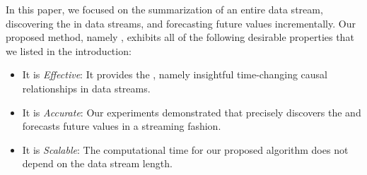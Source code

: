 In this paper,
we focused on the summarization of an entire data stream, discovering the \relation in data streams, and
forecasting future values incrementally.
Our proposed method, namely \method, exhibits all of the following desirable properties that we listed in the introduction:
{\setlength{\leftmargini}{15pt}
\begin{itemize}
    \item It is \textit{Effective}: It provides the \relation, namely insightful time-changing causal relationships in data streams.
    \item It is \textit{Accurate}: Our experiments demonstrated that \method precisely discovers the \relation and forecasts future values in a streaming fashion.
    \item It is \textit{Scalable}: The computational time for our proposed algorithm does not depend on the data stream length.
\end{itemize}}
